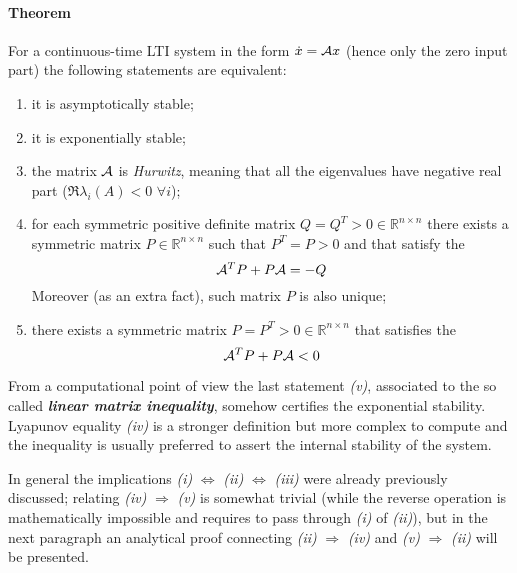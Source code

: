 		\paragraph{Theorem} For a continuous-time LTI system in the form $\dot x =\mathcal{A} x$ (hence only the zero input part) the following statements are equivalent:
		\begin{enumerate}[\itshape (i)]
			\item it is asymptotically stable;
			\item it is exponentially stable;
			\item the matrix $\mathcal{A}$ is \textit{Hurwitz}, meaning that all the eigenvalues have negative real part ($\Re{\lambda_i(A) } < 0$ $\forall i$);
			\item for each symmetric positive definite matrix $Q=Q^T>0 \in \mathds R^{n\times n}$ there exists a symmetric matrix $P\in \mathds R^{n\times n}$ such that $P^T = P > 0$ and that satisfy the 
			\begin{equation} \label{eq:lin:lyapunovequality}
				\mathcal{A}^T P + P\mathcal{A} = -Q 
			\end{equation}
			Moreover (as an extra fact), such matrix $P$ is also unique;
			\item there exists a symmetric matrix $P = P^T > 0 \in \mathds R^{n\times n}$ that satisfies the 
			\[ \mathcal{A}^T P + P\mathcal{A} < 0 \]
		\end{enumerate}
		From a computational point of view the last statement \textit{(v)}, associated to the so called \textbf{\textit{linear matrix inequality}}, somehow certifies the exponential stability. Lyapunov equality \textit{(iv)} is a stronger definition but more complex to compute and the inequality is usually preferred to assert the internal stability of the system.
		
		In general the implications \textit{(i)} $\Leftrightarrow$ \textit{(ii)} $\Leftrightarrow$ \textit{(iii)} were already previously discussed; relating \textit{(iv)} $\Rightarrow$ \textit{(v)} is somewhat trivial (while the reverse operation is mathematically impossible and requires to pass through \textit{(i)} of \textit{(ii)}), but in the next paragraph an analytical proof connecting \textit{(ii)} $\Rightarrow$ \textit{(iv)} and \textit{(v)} $\Rightarrow$ \textit{(ii)} will be presented.
		
